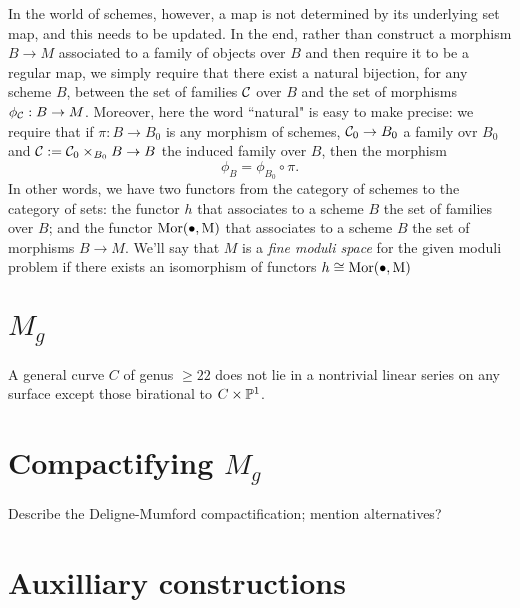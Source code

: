 In the world of schemes, however, a map is not determined by its underlying set map, and this needs to be updated. In the end, rather than construct a morphism $B \to M$ associated to a family of objects over $B$ and then require it to be a regular map, we simply require that there exist a natural bijection, for any scheme $B$, between the set of families $\cC$ over $B$ and the set of morphisms $\phi_\cC : B \to M$. Moreover, here the word ``natural" is easy to make precise: we require that if $\pi : B \to B_0$ is any morphism of schemes, $\cC_0 \to B_0$ a family ovr $B_0$ and $\cC := \cC_0 \times_{B_0} B \to B$ the induced family over $B$, then the morphism
$$
\phi_B = \phi_{B_0} \circ \pi.
$$
In other words, we have two functors from the category of schemes to the category of sets: the functor $h$ that associates to a scheme $B$ the set of families over $B$; and the functor $\rm{Mor}(\bullet, M)$ that associates to a scheme $B$ the set of morphisms $B \to M$. We'll say that $M$ is a \emph{fine moduli space} for the given moduli problem if there exists an isomorphism of functors $h \cong \rm{Mor}(\bullet, M)$

\section{$M_g$}

\begin{corollary}
 A general curve $C$ of  genus $\geq 22$ does not lie in a nontrivial linear series on any surface
 except those birational to $C\times \PP^1$.
\end{corollary}


\section{Compactifying $M_g$}

Describe the Deligne-Mumford compactification; mention alternatives?

\section{Auxilliary constructions}

